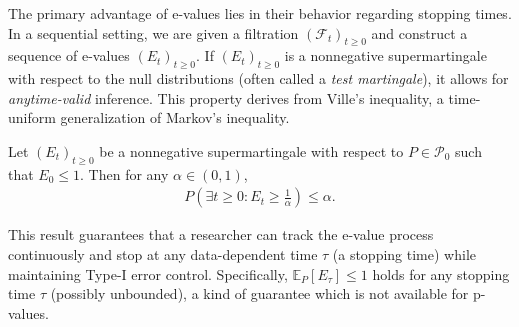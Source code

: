 The primary advantage of e-values lies in their behavior regarding stopping times. In a sequential setting, we are given a filtration $(\mathcal{F}_t)_{t \ge 0}$ and construct a sequence of e-values $(E_t)_{t \ge 0}$. If $(E_t)_{t \ge 0}$ is a nonnegative supermartingale with respect to the null distributions (often called a \textit{test martingale}), it allows for \textit{anytime-valid} inference.
This property derives from Ville's inequality, a time-uniform generalization of Markov's inequality.

\begin{theorem}
Let $(E_t)_{t \ge 0}$ be a nonnegative supermartingale with respect to $P \in \mathcal{P}_0$ such that $E_0 \le 1$. Then for any $\alpha \in (0,1)$,
\begin{align*}
    P\left( \exists t \ge 0 : E_t \ge \frac{1}{\alpha} \right) \le \alpha.
\end{align*}
\end{theorem}

This result guarantees that a researcher can track the e-value process continuously and stop at any data-dependent time $\tau$ (a stopping time) while maintaining Type-I error control. Specifically, $\mathbb{E}_P[E_\tau] \le 1$ holds for any stopping time $\tau$ (possibly unbounded), a kind of guarantee which is not available for p-values.
